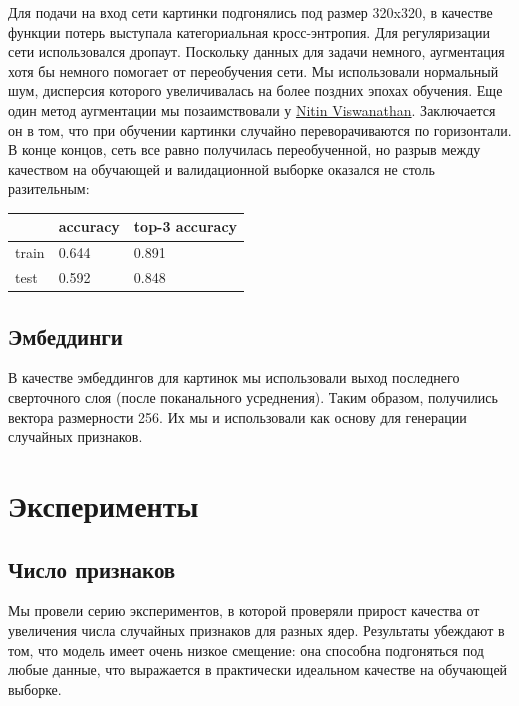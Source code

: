 \documentclass{article}
\newcommand{\bibref}[3]{#2\hyperlink{#1}{\color{blue}#3}}
\begin{document}
Для подачи на вход сети картинки подгонялись под размер 320x320, в качестве функции потерь выступала категориальная кросс-энтропия. Для регуляризации сети использовался дропаут. Поскольку данных для задачи немного, аугментация хотя бы немного помогает от переобучения сети. Мы использовали нормальный шум, дисперсия которого увеличивалась на более поздних эпохах обучения. Еще один метод аугментации мы позаимствовали у \bibref{imclass}{}{Nitin Viswanathan}. Заключается он в том, что при обучении картинки случайно переворачиваются по горизонтали. В конце концов, сеть все равно получилась переобученной, но разрыв между качеством на обучающей и валидационной выборке оказался не столь разительным:

\begin{table}[H]
\centering

\begin{tabular}{M{2cm}|M{3cm}M{3cm}}
     & accuracy & top-3 accuracy \\
    \hline
    train & 0.644 & 0.891 \\
    test & 0.592 & 0.848 \\
\end{tabular}

\label{tab:my_label}
\end{table}

\subsection{Эмбеддинги}

В качестве эмбеддингов для картинок мы использовали выход последнего сверточного слоя (после поканального усреднения). Таким образом, получились вектора размерности 256. Их мы и использовали как основу для генерации случайных признаков.

\section{Эксперименты}

\subsection{Число признаков}

Мы провели серию экспериментов, в которой проверяли прирост качества от увеличения числа случайных признаков для разных ядер. Результаты убеждают в том, что модель имеет очень низкое смещение: она способна подгоняться под любые данные, что выражается в практически идеальном качестве на обучающей выборке.
\end{document}
